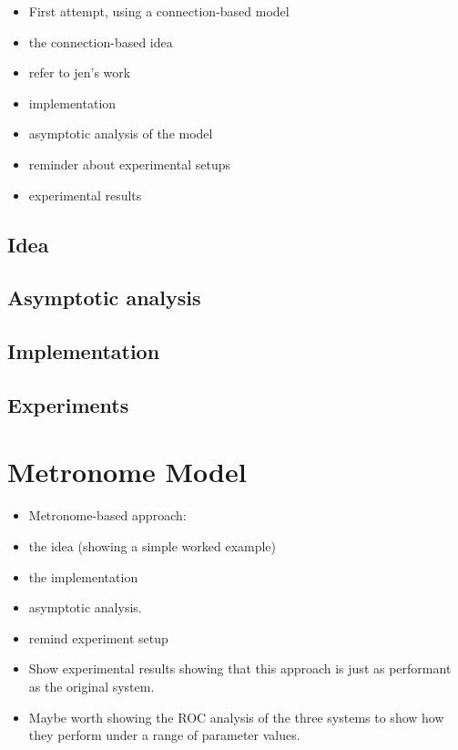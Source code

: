 \documentclass[11pt, a4paper]{report}
\begin{document}
\begin{itemize}
\item First attempt, using a connection-based model
\item the connection-based idea
\item refer to jen's work
\item implementation
\item asymptotic analysis of the model
\item reminder about experimental setups
\item experimental results
\end{itemize}

\section{Idea}
\section{Asymptotic analysis}
\section{Implementation}
\section{Experiments}

\chapter{Metronome Model}
\label{cha:metronome-model}

\begin{itemize}
\item Metronome-based approach:
\item the idea (showing a simple worked
  example)
\item the implementation
\item asymptotic analysis.
\item remind experiment setup
\item Show experimental results showing that this approach is just as
  performant as the original system.
\item Maybe worth showing the ROC analysis of the three systems to show
  how they perform under a range of parameter values.
\end{itemize}
\end{document}
